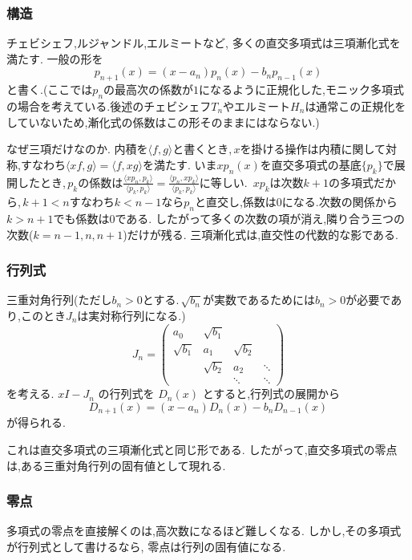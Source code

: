 \subsubsection{構造}

チェビシェフ,ルジャンドル,エルミートなど,
多くの直交多項式は三項漸化式を満たす.
一般の形を
\[
  p_{n+1}(x)
  =(x-a_n)p_n(x)-b_np_{n-1}(x)
\]
と書く.(ここでは$p_n$の最高次の係数が$1$になるように正規化した,モニック多項式の場合を考えている.後述のチェビシェフ$T_n$やエルミート$H_n$は通常この正規化をしていないため,漸化式の係数はこの形そのままにはならない.)

なぜ三項だけなのか.
内積を$\langle f,g\rangle$と書くとき,\,$x$を掛ける操作は内積に関して対称,すなわち$\langle xf,g\rangle=\langle f,xg\rangle$を満たす.
いま$xp_n(x)$を直交多項式の基底$\{p_k\}$で展開したとき,\,$p_k$の係数は$\frac{\langle xp_n,p_k\rangle}{\langle p_k,p_k\rangle}=\frac{\langle p_n,xp_k\rangle}{\langle p_k,p_k\rangle}$に等しい.
\,$xp_k$は次数$k+1$の多項式だから,\,$k+1<n$すなわち$k<n-1$なら$p_n$と直交し,係数は$0$になる.次数の関係から$k>n+1$でも係数は$0$である.
したがって多くの次数の項が消え,隣り合う三つの次数($k=n-1,n,n+1$)だけが残る.
三項漸化式は,直交性の代数的な影である.

\subsubsection{行列式}

三重対角行列(ただし$b_n>0$とする.\,$\sqrt{b_n}$が実数であるためには$b_n>0$が必要であり,このとき$J_n$は実対称行列になる.)
\[
  J_n=
  \begin{pmatrix}
    a_0&\sqrt{b_1}&&\\
    \sqrt{b_1}&a_1&\sqrt{b_2}&\\
    &\sqrt{b_2}&a_2&\ddots\\
    &&\ddots&\ddots
  \end{pmatrix}
\]
を考える.
$xI-J_n$ の行列式を $D_n(x)$ とすると,行列式の展開から
\[
  D_{n+1}(x)
  =(x-a_n)D_n(x)-b_nD_{n-1}(x)
\]
が得られる.

これは直交多項式の三項漸化式と同じ形である.
したがって,直交多項式の零点は,ある三重対角行列の固有値として現れる.

\subsubsection{零点}

多項式の零点を直接解くのは,高次数になるほど難しくなる.
しかし,その多項式が行列式として書けるなら,
零点は行列の固有値になる.

